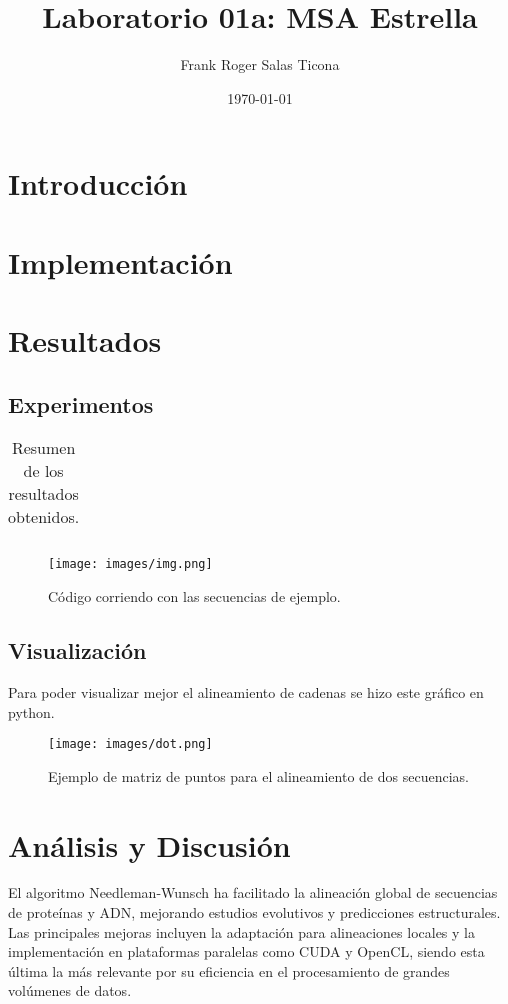 \documentclass{article}
\title{Laboratorio 01a: MSA Estrella}
\author{Frank Roger Salas Ticona}
\date{\today}
\begin{document}
\maketitle

\section{Introducción}

\section{Implementación}

\section{Resultados}
\subsection{Experimentos}

\begin{table}[ht]
    \centering
    \begin{tabular}{|l|c|c|c|}
        \hline

        \hline
    \end{tabular}
    \caption{Resumen de los resultados obtenidos.}
    \label{tab:resultados}
\end{table}

\begin{figure}[ht]
    \centering
    \texttt{[image: images/img.png]}
    \caption{Código corriendo con las secuencias de ejemplo.}
    \label{fig:code}
\end{figure}

\subsection{Visualización}
Para poder visualizar mejor el alineamiento de cadenas se hizo este gráfico en python.
\begin{figure}[!htpb]
    \centering
    \texttt{[image: images/dot.png]}
    \caption{Ejemplo de matriz de puntos para el alineamiento de dos secuencias.}
    \label{fig:matriz_puntos}
\end{figure}

\section{Análisis y Discusión}
El algoritmo Needleman-Wunsch ha facilitado la alineación global de secuencias de proteínas y ADN, mejorando estudios evolutivos y predicciones estructurales. Las principales mejoras incluyen la adaptación para alineaciones locales y la implementación en plataformas paralelas como CUDA y OpenCL, siendo esta última la más relevante por su eficiencia en el procesamiento de grandes volúmenes de datos.
\end{document}
